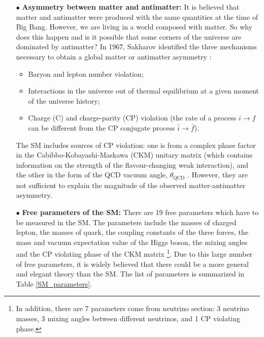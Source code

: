 \begin{enumerate}
\item[$\bullet$]\textbf{Asymmetry between matter and antimatter:} It is believed that matter and antimatter were produced with the same quantities at the time of Big Bang. However, we are living in a world composed with matter. So why does this happen and is it possible that some corners of the universe are dominated by antimatter$?$ In 1967, Sakharov identified the three mechanisms necessary to obtain a global matter or antimatter asymmetry \cite{SAKHAROV}:
     \begin{itemize}
     \item Baryon and lepton number violation;
     \item Interactions in the universe out of thermal equilibrium at a given moment of the universe history;
     \item Charge (C) and charge-parity (CP) violation (the rate of a process $i\rightarrow f$ can be different from the CP conjugate process $\bar{i}\rightarrow\bar{f}$).
     \end{itemize}
    The SM includes sources of CP violation: one is from a complex phase factor in the Cabibbo-Kobayashi-Maskawa (CKM) \cite{PhysRevLett.10.531,10.1143/PTP.49.652} unitary matrix (which contains information on the strength of the flavour-changing weak interaction), and the other in the form of the QCD vacuum angle, $\theta_{\mathrm{QCD}}$ \cite{RevModPhys.70.323}. However, they are not sufficient to explain the magnitude of the observed matter-antimatter asymmetry.

\item[$\bullet$]\textbf{Free parameters of the SM:} There are 19 free parameters which have to be measured in the SM. The parameters include the masses of charged lepton, the masses of quark, the coupling constants of the three forces, the mass and vacuum expectation value of the Higgs boson, the mixing angles and the CP violating phase of the CKM matrix \footnote{In addition, there are 7 parameters come from neutrino section: 3 neutrino masses, 3 mixing angles between different neutrinos, and 1 CP violating phase.}. Due to this large number of free parameters, it is widely believed that there could be a more general and elegant theory than the SM. The list of parameters is summarized in Table \ref{SM_parameters}.


\end{enumerate}
